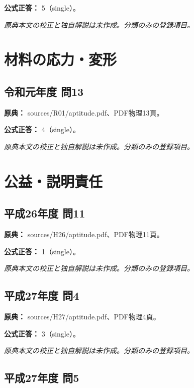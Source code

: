 \textbf{公式正答：} 5（single）。

\par\textit{原典本文の校正と独自解説は未作成。分類のみの登録項目。}

\section{材料の応力・変形}

\subsection{令和元年度 問13}
\label{q:r01-reg-apt-13}

\noindent\textbf{原典：} sources/R01/aptitude.pdf、PDF物理13頁。

\textbf{公式正答：} 4（single）。

\par\textit{原典本文の校正と独自解説は未作成。分類のみの登録項目。}

\section{公益・説明責任}

\subsection{平成26年度 問11}
\label{q:h26-reg-apt-11}

\noindent\textbf{原典：} sources/H26/aptitude.pdf、PDF物理11頁。

\textbf{公式正答：} 1（single）。

\par\textit{原典本文の校正と独自解説は未作成。分類のみの登録項目。}

\subsection{平成27年度 問4}
\label{q:h27-reg-apt-04}

\noindent\textbf{原典：} sources/H27/aptitude.pdf、PDF物理4頁。

\textbf{公式正答：} 3（single）。

\par\textit{原典本文の校正と独自解説は未作成。分類のみの登録項目。}

\subsection{平成27年度 問5}
\label{q:h27-reg-apt-05}

